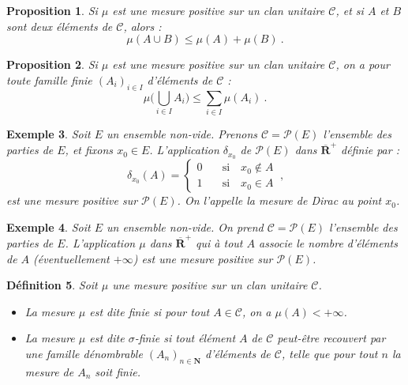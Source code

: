 \documentclass{scrreport}
\theoremstyle{def}
\newtheorem{definition}{Définition}
\newtheorem{example}[definition]{Exemple}
\theoremstyle{thm}
\theoremstyle{prop}
\newtheorem{proposition}[definition]{Proposition}
\theoremstyle{rem}
\numberwithin{definition}{section}
\numberwithin{lemma}{section}
\numberwithin{proposition}{section}
\numberwithin{theorem}{section}
\numberwithin{corol}{section}
\numberwithin{notation}{section}
\numberwithin{example}{section}
\numberwithin{exercise}{section}
\numberwithin{remark}{section}
\newcommand{\N}{\mathbf{N}}
\newcommand{\R}{\mathbf{R}}
\newcommand{\RR}{\overline{\R}}
\newcommand{\scrC}{\mathscr{C}}
\newcommand{\scrP}{\mathscr{P}}
\begin{document}
\begin{proposition}\label{prop2:1:5}
	Si \(\mu\) est une mesure positive sur un clan unitaire \(\scrC\), et si \(A\) et \(B\) sont deux éléments de \(\scrC\), alors :
	\[ \mu(A \cup B) \leqslant \mu(A) + \mu(B) \: \text{.} \]
\end{proposition}

\begin{proposition}\label{prop2:1:6}
	Si \(\mu\) est une mesure positive sur un clan unitaire \(\scrC\), on a pour toute famille finie \({(A_i)}_{i \in I}\) d'éléments de \(\scrC\) :
	\[ \mu \Biggl( \bigcup_{i \in I} A_i \Biggr) \leqslant \sum_{i \in I} \mu(A_i) \: \text{.} \]
\end{proposition}

\begin{example}\label{expl2:1:7}
	Soit \(E\) un ensemble non-vide. Prenons \(\scrC = \scrP(E)\) l'ensemble des parties de \(E\), et fixons \(x_0 \in E\). L'application \(\delta_{x_0}\) de \(\scrP(E)\) dans \(\RR^+\) définie par :
	\[ \delta_{x_0}(A) = \begin{cases} 0 & \quad \text{si} \quad x_0 \notin A \\ 1 & \quad \text{si} \quad x_0 \in A \end{cases} \: \text{,} \]
	est une mesure positive sur \(\scrP(E)\). On l'appelle la mesure de Dirac au point \(x_0\).
\end{example}

\begin{example}\label{expl2:1:8}
	Soit \(E\) un ensemble non-vide. On prend \(\scrC = \scrP(E)\) l'ensemble des parties de \(E\). L'application \(\mu\) dans \(\RR^+\) qui à tout \(A\) associe le nombre d'éléments de \(A\) (éventuellement \(+\infty\)) est une mesure positive sur \(\scrP(E)\).
\end{example}

\begin{definition}\label{def2:1:9}
	Soit \(\mu\) une mesure positive sur un clan unitaire \(\scrC\).
	\begin{itemize}
		\item La mesure \(\mu\) est dite finie si pour tout \(A \in \scrC\), on a \(\mu(A) < +\infty\).
		\item La mesure \(\mu\) est dite \(\sigma\)-finie si tout élément \(A\) de \(\scrC\) peut-être recouvert par une famille dénombrable \({(A_n)}_{n \in \N}\) d'éléments de \(\scrC\), telle que pour tout \(n\) la mesure de \(A_n\) soit finie.
	\end{itemize}
\end{definition}
\end{document}
